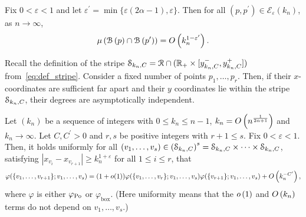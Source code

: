 \begin{lemma}\label{cor:expected_common_neighbours_KPKVB}
Fix $0 < \varepsilon < 1$ and let $\varepsilon^\prime = \min\{\varepsilon(2\alpha - 1),\varepsilon\}$. Then for all $(p,p^\prime) \in \mathcal{E}_\varepsilon(k_n)$, as $n \to \infty$,
\[
	\mu\left({\mathcal B}\left(p\right) \cap {\mathcal B}\left(p^\prime\right)\right) = O\left(k_n^{1-\varepsilon^\prime}\right).
\] 
\end{lemma}

Recall the definition of the stripe $\mathcal{S}_{k_n,C} = {\mathcal R} \cap ({\mathbb R}_+ \times [y_{k_n,C}^-, y_{k_n,C}^+])$ from~\eqref{eq:def_stripe}. Consider a fixed number of points $p_1, \dots, p_r$. Then, if their $x$-coordinates are sufficient far apart and their $y$ coordinates lie within the stripe $\mathcal{S}_{k_n,C}$, their degrees are asymptotically independent.

\begin{lemma}\label{lem:probdegFact}
Let $(k_n)$ be a sequence of integers with $0\leq k_n \leq n-1$, $k_n = O\left(n^{\frac{1}{2\alpha+1}}\right)$ and $k_n \rightarrow \infty$.
Let $C, C^\prime>0$ and $r,s$ be positive integers with $r+1\leq s$. Fix $0<\varepsilon<1$. Then, it holds uniformly for all $(v_1,\dots,v_s) \in \left(\mathcal{S}_{k_n,C}\right)^{s} = \mathcal{S}_{k_n,C} \times \dots \times \mathcal{S}_{k_n,C}$, satisfying $|x_{v_i}-x_{v_{r+1}}|\geq k_n^{1+\varepsilon}$ for all  $1\leq i \leq r$,  that
\[
	\varphi(\{v_1,\dots,v_{r+1}\};v_1,\dots,v_s)
	=(1+o(1))\varphi(\{v_1,\dots,v_r\};v_1,\dots,v_s)\varphi(\{v_{r+1}\};v_1,\dots,v_s)+O\left(k_n^{-C^\prime}\right),
\]
where $\varphi$ is either $\varphi_{{\mathrm{Po}}}$ or $\varphi_{\mathrm{box}}$.
(Here uniformity means that the $o\left(1\right)$ and $O\left(k_n\right)$ terms do not depend on $v_1,\dots,v_{s}$.)
\end{lemma}

